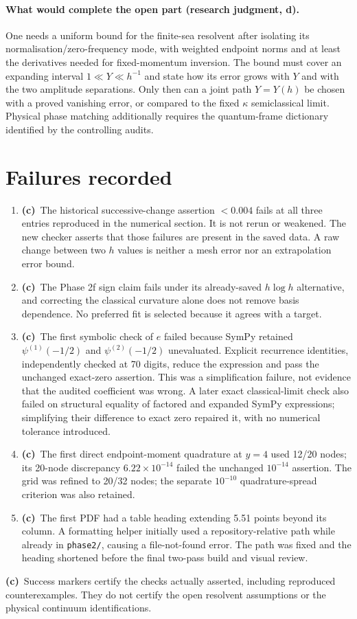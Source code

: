\documentclass[11pt,a4paper]{article}
\newcommand{\C}{\textbf{(c)}\ }
\newcommand{\file}[1]{\nolinkurl{#1}}
\begin{document}
\paragraph{What would complete the open part (research judgment, d).}
One needs a uniform bound for the finite-sea resolvent after isolating its
normalisation/zero-frequency mode, with weighted endpoint norms and at least
the derivatives needed for fixed-momentum inversion. The bound must cover an
expanding interval $1\ll Y\ll h^{-1}$ and state how its error grows with $Y$
and with the two amplitude separations. Only then can a joint path
$Y=Y(h)$ be chosen with a proved vanishing error, or compared to the fixed
$\kappa$ semiclassical limit. Physical phase matching additionally requires
the quantum-frame dictionary identified by the controlling audits.

\section{Failures recorded}
\begin{enumerate}
\item \C The historical successive-change assertion $<0.004$ fails at all
three entries reproduced in the numerical section. It is not rerun or
weakened. The new checker asserts that those failures are present in the
saved data. A raw change between two $h$ values is neither a mesh error nor
an extrapolation error bound.
\item \C The Phase 2f sign claim fails under its already-saved $h\log h$
alternative, and correcting the classical curvature alone does not remove
basis dependence. No preferred fit is selected because it agrees with a target.
\item \C The first symbolic check of $e$ failed because SymPy retained
$\psi^{(1)}(-1/2)$ and $\psi^{(2)}(-1/2)$ unevaluated. Explicit recurrence
identities, independently checked at 70 digits, reduce the expression and
pass the unchanged exact-zero assertion. This was a simplification failure,
not evidence that the audited coefficient was wrong. A later exact
classical-limit check also failed on structural equality of factored and
expanded SymPy expressions; simplifying their difference to exact zero
repaired it, with no numerical tolerance introduced.
\item \C The first direct endpoint-moment quadrature at $y=4$ used 12/20
nodes; its 20-node discrepancy $6.22\times10^{-14}$ failed the unchanged
$10^{-14}$ assertion. The grid was refined to 20/32 nodes; the separate
$10^{-10}$ quadrature-spread criterion was also retained.
\item \C The first PDF had a table heading extending 5.51 points beyond its
column. A formatting helper initially used a repository-relative path while
already in \file{phase2/}, causing a file-not-found error. The path was fixed
and the heading shortened before the final two-pass build and visual review.
\end{enumerate}
\C Success markers certify the checks actually asserted, including reproduced
counterexamples. They do not certify the open resolvent assumptions or the
physical continuum identifications.
\end{document}
